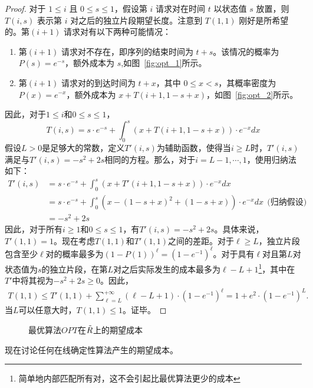 \begin{proof}
对于 $1\leq i$ 且 $0\leq s\leq 1$，假设第 $i$ 请求对在时间 $t$ 以状态值 $s$ 放置，则 $T(i,s)$ 表示第 $i$ 对之后的独立片段期望长度。注意到 $T(1,1)$ 刚好是所希望的。第$(i+1)$ 请求对有以下两种可能情况：
\renewcommand{\labelenumi}{(\arabic{enumi})}
\begin{enumerate}[align=left, labelsep=0.5em, itemindent=2.5em, leftmargin=0em]
    \item 第$(i+1)$ 请求对不存在，即序列的结束时间为 $t+s$。该情况的概率为 $P(s)=e^{-s}$，额外成本为 $s$,如图~\ref{fig:opt_1}所示。
    \item 第$(i+1)$ 请求对的到达时间为 $t+x$，其中 $0\leq x < s$，其概率密度为 $P(x)=e^{-x}$，额外成本为 $x+T(i+1,1-s+x)$，如图~\ref{fig:opt_2}所示。
\end{enumerate}

因此，对于$1\leq i$和$0\leq s \leq 1$，
$$
    T(i,s)=s\cdot e^{-s}+\int_{0}^{s}(x+T(i+1,1-s+x))\cdot e^{-x}dx
$$
假设$L>0$是足够大的常数，定义$T'(i,s)$为辅助函数，使得当$i\geq L$时，$T'(i,s)$满足与$T'(i,s)=-s^2+2s$相同的方程。那么，对于$i=L-1,\cdots,1$，使用归纳法如下：
\begin{align*}
    T'(i,s)&=s\cdot e^{-s}+\int_{0}^{s}(x+T'(i+1,1-s+x))\cdot e^{-x}dx \\
    &=s\cdot e^{-s}+\int_{0}^{s}(x-(1-s+x)^2+(1-s+x))\cdot e^{-x}dx \ \ \text{(归纳假设)}\\
    &=-s^2+2s
\end{align*}
因此，对于所有$i \geq 1$和$0 \leq s \leq 1$，有$T'(i,s)=-s^2+2s$。具体来说，$T'(1,1)=1$。现在考虑$T(1,1)$和$T'(1,1)$之间的差距。对于$\ell \geq L$，独立片段包含至少$\ell$对的概率最多为$(1-P(1))^{\ell}=(1-e^{-1})^{\ell}$。对于具有$\ell$对且第$L$对状态值为$s$的独立片段，在第$L$对之后实际发生的成本最多为$\ell-L+1$\footnote{简单地内部匹配所有对，这不会引起比最优算法更少的成本}，其中在$T'$中将其视为$-s^2+2s\geq 0$。因此，
\begin{align*}
    T(1,1)\leq T'(1,1)+\sum_{\ell=L}^{+\infty} (\ell-L+1)\cdot (1-e^{-1})^{\ell} = 1+e^2\cdot (1-e^{-1})^L.
\end{align*}
当$L$可以任意大时，$T(1,1)\leq 1$。证毕。 
\end{proof}
\begin{figure}
  \centering
  
  \caption{最优算法$OPT$在$\tilde{R}$上的期望成本}
\end{figure}

现在讨论任何在线确定性算法产生的期望成本。

